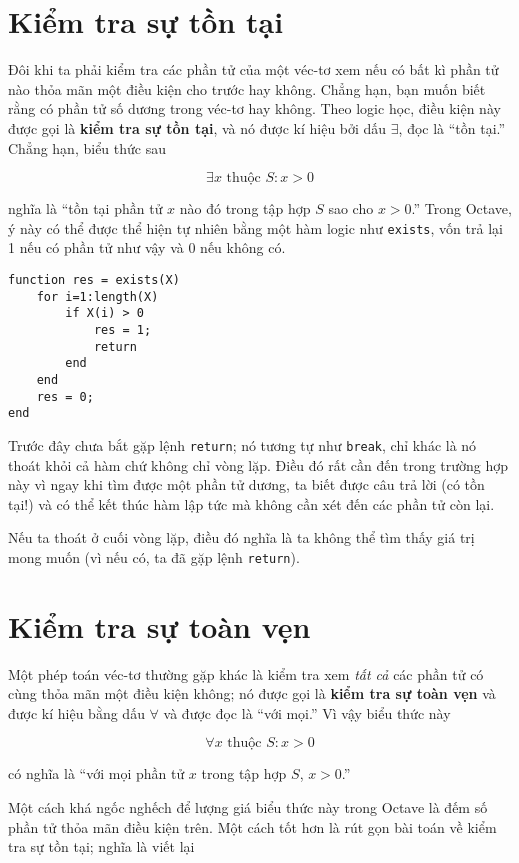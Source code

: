 \documentclass[12pt]{book}
\begin{document}
\section{Kiểm tra sự tồn tại}

Đôi khi ta phải kiểm tra các phần tử của một véc-tơ xem nếu có
bất kì phần tử nào thỏa mãn một điều kiện cho trước hay không.
Chẳng hạn, bạn muốn biết rằng có phần tử số dương trong véc-tơ
hay không. Theo logic học, điều kiện này được gọi là 
{\bf kiểm tra sự tồn tại}, và nó được kí hiệu bởi dấu $\exists$, 
đọc là ``tồn tại.''  Chẳng hạn, biểu thức sau

\[ \exists x \mbox{~thuộc~} S: x>0 \]

\noindent nghĩa là ``tồn tại phần tử $x$ nào đó trong tập hợp $S$ sao cho
$x>0$.''  Trong Octave, ý này có thể được thể hiện tự nhiên bằng
một hàm logic như {\tt exists}, vốn trả lại 1 nếu có phần tử như vậy
và 0 nếu không có.

\begin{verbatim}
function res = exists(X)
    for i=1:length(X)
        if X(i) > 0
            res = 1;
            return
        end
    end
    res = 0;
end
\end{verbatim}
%
Trước đây chưa bắt gặp lệnh {\tt return}; nó tương tự như 
{\tt break}, chỉ khác là nó thoát khỏi cả hàm chứ không chỉ vòng lặp.
Điều đó rất cần đến trong trường hợp này vì ngay khi tìm được một
phần tử dương, ta biết được câu trả lời (có tồn tại!) và có thể
kết thúc hàm lập tức mà không cần xét đến các phần tử còn lại.

Nếu ta thoát ở cuối vòng lặp, điều đó nghĩa là ta không thể tìm
thấy giá trị mong muốn (vì nếu có, ta đã gặp lệnh {\tt return}).



\section{Kiểm tra sự toàn vẹn}

Một phép toán véc-tơ thường gặp khác là kiểm tra xem {\em tất cả}
các phần tử có cùng thỏa mãn một điều kiện không; nó được gọi là
{\bf kiểm tra sự toàn vẹn} và được kí hiệu bằng dấu $\forall$ và
được đọc là ``với mọi.''  Vì vậy biểu thức này

\[ \forall x \mbox{~thuộc~} S: x>0 \]

\noindent có nghĩa là ``với mọi phần tử $x$ trong tập hợp $S$, $x>0$.''

Một cách khá ngốc nghếch để lượng giá biểu thức này trong Octave
là đếm số phần tử thỏa mãn điều kiện trên. Một cách tốt hơn là
rút gọn bài toán về kiểm tra sự tồn tại; nghĩa là viết lại
\end{document}
